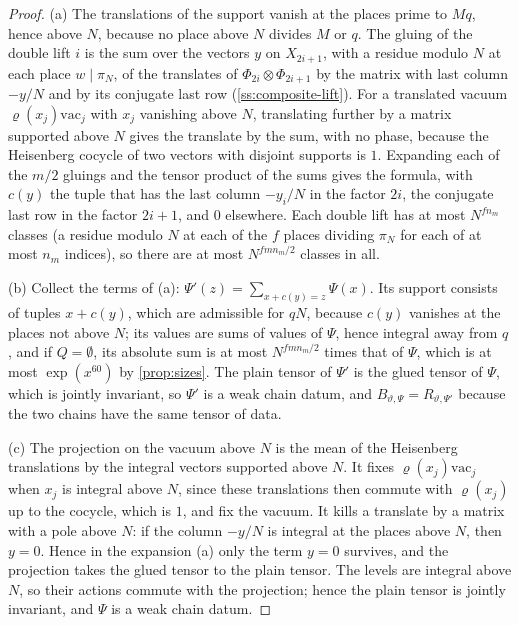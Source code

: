 \begin{proof}
(a) The translations of the support vanish at the places prime to $Mq$, hence above $N$, because no place above $N$ divides $M$ or $q$. The gluing of the double lift $i$ is the sum over the vectors $y$ on $X_{2i+1}$, with a residue modulo $N$ at each place $w\mid\pi_N$, of the translates of $\Phi_{2i}\otimes\Phi_{2i+1}$ by the matrix with last column $-y/N$ and by its conjugate last row
(\cref{ss:composite-lift}). For a translated vacuum $\varrho(x_j)\mathrm{vac}_j$ with $x_j$ vanishing above $N$, translating further by a matrix supported above $N$ gives the translate by the sum, with no phase, because the Heisenberg cocycle of two vectors with disjoint supports is $1$. Expanding each of the $m/2$ gluings and the tensor product of the sums gives
the formula, with $c(y)$ the tuple that has the last column $-y_i/N$ in the factor $2i$, the conjugate last row in the factor $2i+1$, and $0$ elsewhere. Each double lift has at most $N^{fn_m}$ classes (a residue modulo $N$ at each of the $f$ places dividing $\pi_N$ for each of at most $n_m$ indices), so there are at most $N^{fmn_m/2}$ classes in all.

(b) Collect the terms of (a): $\Psi'(z)=\sum_{x+c(y)=z}\Psi(x)$. Its support consists of tuples $x+c(y)$, which are admissible for $qN$, because $c(y)$ vanishes at the places not above $N$; its values are sums of values of $\Psi$, hence integral away from $q$, and if $Q=\emptyset$, its absolute sum is at most $N^{fmn_m/2}$ times that of $\Psi$, which is at most
$\exp(x^{60})$ by \cref{prop:sizes}. The plain tensor of $\Psi'$ is the glued tensor of $\Psi$, which is jointly invariant, so $\Psi'$ is a weak chain datum, and $B_{\vartheta,\Psi}=R_{\vartheta,\Psi'}$ because the two chains have the same tensor of data.

(c) The projection on the vacuum above $N$ is the mean of the Heisenberg translations by the integral vectors supported above $N$. It fixes $\varrho(x_j)\mathrm{vac}_j$ when $x_j$ is integral above $N$, since these translations then commute with $\varrho(x_j)$ up to the cocycle, which is $1$, and fix the vacuum. It kills a translate by a matrix with a pole above
$N$: if the column $-y/N$ is integral at the places above $N$, then $y=0$. Hence in the expansion (a) only the term $y=0$ survives, and the projection takes the glued tensor to the plain tensor. The levels are integral above $N$, so their actions commute with the projection; hence the plain tensor is jointly invariant, and $\Psi$ is a weak chain datum.
\end{proof}

